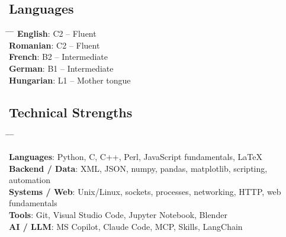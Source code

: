 \documentclass[a4paper,10pt]{article}
\begin{document}
\subsection*{Languages}
\begin{tabbing}
    \hspace{0.55cm} \= \hspace{2.55cm} \= \hspace{3cm} \= \kill %
    \> \textbf{English}:  \> C2 -- Fluent \\
    \> \textbf{Romanian}:  \> C2 -- Fluent \\
    \> \textbf{French}:   \> B2 -- Intermediate \\
    \> \textbf{German}:   \> B1 -- Intermediate \\
    \> \textbf{Hungarian}: \> L1 -- Mother tongue \\
\end{tabbing}


\subsection*{Technical Strengths}

\begin{tabbing}
    \hspace{0.55cm} \= \hspace{4.55cm} \= \hspace{3cm} \= \kill %

    \> \textbf{Languages}:  \> Python, C, C++, Perl, JavaScript fundamentals, LaTeX \\
    \> \textbf{Backend / Data}:  \> XML, JSON, numpy, pandas, matplotlib, scripting, automation \\
    \> \textbf{Systems / Web}:   \> Unix/Linux, sockets, processes, networking, HTTP, web fundamentals \\
    \> \textbf{Tools}:   \> Git, Visual Studio Code, Jupyter Notebook, Blender \\
    \> \textbf{AI / LLM}:   \> MS Copilot, Claude Code, MCP, Skills, LangChain \\

\end{tabbing}
\end{document}
